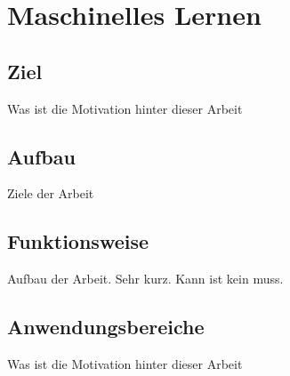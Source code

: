 \chapter{Maschinelles Lernen}
\label{chap:maschinellesLernen}
\chapterauthor{\authorMarco}
\section{Ziel}
\label{sec:ziel}
Was ist die Motivation hinter dieser Arbeit

\section{Aufbau}
\label{sec:aufbau}
Ziele der Arbeit

\section{Funktionsweise}
\label{sec:funktionsweise}
Aufbau der Arbeit. Sehr kurz. Kann ist kein muss.

\section{Anwendungsbereiche}
\label{sec:anwendungsbereiche}
Was ist die Motivation hinter dieser Arbeit